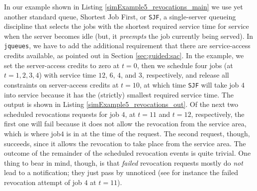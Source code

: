 In our example shown in Listing \ref{simExample5_revocations_main}
we use yet another standard queue, Shortest Job First,
or \lstinline|SJF|, a single-server
queueing discipline that selects
the jobs with the shortest required service time
for service when the server becomes idle
(but, it {\em preempts\/} the job currently being served).
In \lstinline|jqueues|,
we have to add the additional requirement
that there are service-access credits available,
as pointed out in Section \ref{sec:guided:sac}.
In the example,
we set the server-access credits to zero at $t=0$,
then we schedule four jobs (at
$t=1, 2, 3, 4$) with service time
$12$, $6$, $4$, and $3$, respectively,
and release all constraints on server-access
credits at $t=10$,
at which time \lstinline|SJF| will
take job $4$ into service because it has the (strictly) smallest
required service time.
The output is shown in Listing \ref{simExample5_revocations_out}.
Of the next two scheduled revocations requests for job $4$,
at $t=11$ and $t=12$, respectively,
the first one will fail because it does not allow
the revocation from the service area,
which is where job$4$ is in at the time of the request.
The second request, though, succeeds, since it allows the
revocation to take place from the service area.
The outcome of the remainder of the scheduled revocation events
is quite trivial.
One thing to bear in mind, though,
is that {\em failed\/} revocation requests mostly
do {\em not\/} lead to a notification;
they just pass by unnoticed
(see for instance the failed revocation attempt
of job $4$ at $t=11$).

